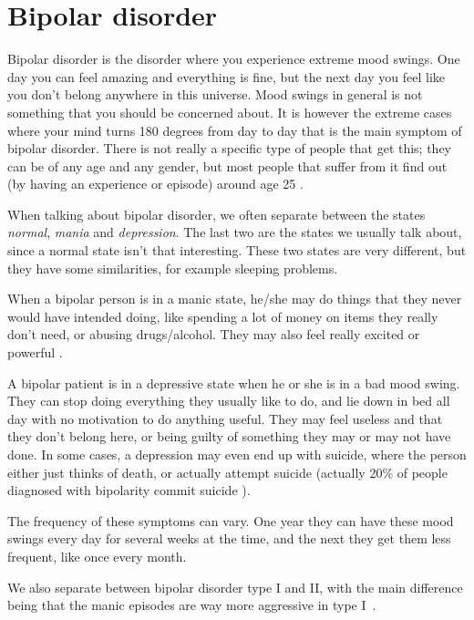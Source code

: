 \newpage
\section{Bipolar disorder}

Bipolar disorder is the disorder where you experience extreme mood swings. One day you can feel amazing and 
everything is fine, but the next day you feel like you don't belong anywhere in this universe. 
Mood swings in general is not something that you should be concerned about. It is however the extreme cases where 
your mind turns 180 degrees from day to day that is the main symptom of bipolar disorder. 
There is not really a specific type of people that get this; they can be of any age and any gender, 
but most people that suffer from it find out (by having an experience or episode) around age 25 \cite{bipolar_statistics}. 

When talking about bipolar disorder, we often separate between the states \emph{normal}, \emph{mania} 
and \emph{depression}. The last two are the states we usually talk about, since a normal state isn't that interesting. 
These two states are very different, but they have some similarities, for example sleeping problems. 

When a bipolar person is in a manic state, he/she may do things that they never would have intended doing, 
like spending a lot of money on items they really don't need, or abusing drugs/alcohol. 
They may also feel really excited or powerful \cite{bipolar_overview}. 

A bipolar patient is in a depressive state when he or she is in a bad mood swing. They can stop doing everything 
they usually like to do, and lie down in bed all day with no motivation to do anything useful. 
They may feel useless and that they don't belong here, or being guilty of something they may or may not have done. 
In some cases, a depression may even end up with suicide, where the person either just thinks of death, 
or actually attempt suicide (actually 20\% of people diagnosed with bipolarity commit suicide \cite{bipolar_statistics}). 

The frequency of these symptoms can vary. One year they can have these mood swings every day for several weeks at the time, 
and the next they get them less frequent, like once every month. 

We also separate between bipolar disorder type I and II, with the main difference being that the manic episodes 
are way more aggressive in type I \cite{bipolar_types}.

